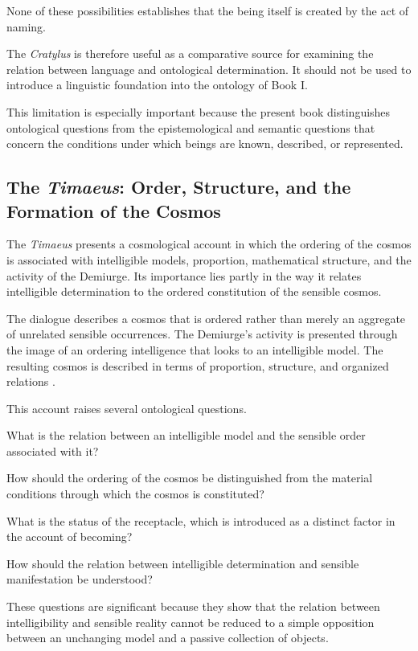 None of these possibilities establishes that the being itself is
created by the act of naming.

The \textit{Cratylus} is therefore useful as a comparative source
for examining the relation between language and ontological
determination. It should not be used to introduce a linguistic
foundation into the ontology of Book I.

This limitation is especially important because the present book
distinguishes ontological questions from the epistemological and
semantic questions that concern the conditions under which beings
are known, described, or represented.

\subsection{The \textit{Timaeus}: Order, Structure, and the Formation of the Cosmos}

The \textit{Timaeus} presents a cosmological account in which the
ordering of the cosmos is associated with intelligible models,
proportion, mathematical structure, and the activity of the Demiurge.
Its importance lies partly in the way it relates intelligible
determination to the ordered constitution of the sensible cosmos.

The dialogue describes a cosmos that is ordered rather than merely
an aggregate of unrelated sensible occurrences. The Demiurge's
activity is presented through the image of an ordering intelligence
that looks to an intelligible model. The resulting cosmos is described
in terms of proportion, structure, and organized relations
\citep{PlatoTimaeus}.

This account raises several ontological questions.

What is the relation between an intelligible model and the sensible
order associated with it?

How should the ordering of the cosmos be distinguished from the
material conditions through which the cosmos is constituted?

What is the status of the receptacle, which is introduced as a
distinct factor in the account of becoming?

How should the relation between intelligible determination and
sensible manifestation be understood?

These questions are significant because they show that the relation
between intelligibility and sensible reality cannot be reduced to
a simple opposition between an unchanging model and a passive
collection of objects.

